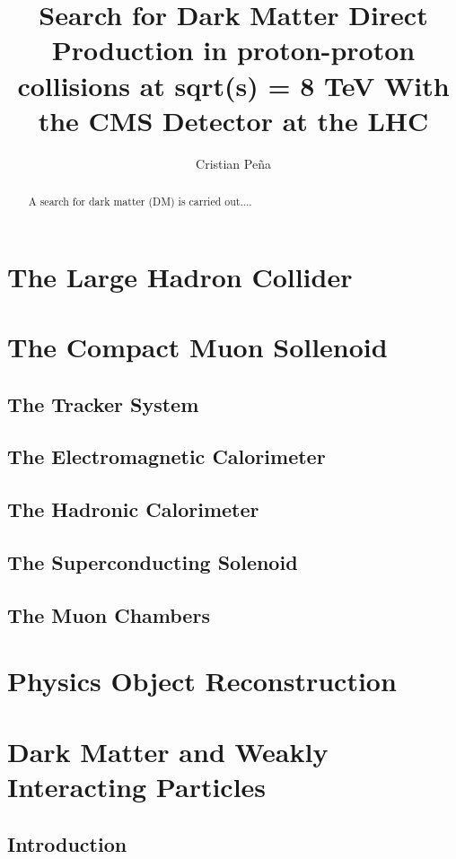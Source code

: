 \documentclass[draftfoot,preprint]{cit_thesis}
\begin{document}
\title{Search for Dark Matter Direct Production in proton-proton collisions at sqrt(s) = 8 TeV With the CMS Detector at the LHC}
\author{Cristian Pe\~na}

\maketitle

\begin{abstract}
A search for dark matter (DM) is carried out....
\end{abstract}



\section{The Large Hadron Collider}
\section{The Compact Muon Sollenoid}
\subsection{The Tracker System}
\subsection{The Electromagnetic Calorimeter}
\subsection{The Hadronic Calorimeter}
\subsection{The Superconducting Solenoid}
\subsection{The Muon Chambers}
\section{Physics Object Reconstruction}
\section{Dark Matter and Weakly Interacting Particles}
\subsection{Introduction}
\end{document}
